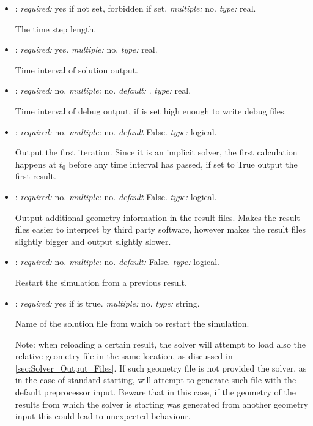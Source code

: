 \begin{itemize}
\item {}: \textit{required:} yes if  not set, forbidden if set. \textit{multiple:} no. \textit{type:} real.

The time step length.

\item {}: \textit{required:} yes. \textit{multiple:} no. \textit{type:} real.

Time interval of solution output.

\item {}: \textit{required:} no. \textit{multiple:} no. \textit{default:} . \textit{type:} real.

Time interval of debug output, if  is set high enough to write debug files.


\item {}: \textit{required:} no. \textit{multiple:} no. \textit{default} False. \textit{type:} logical.

Output the first iteration. Since it is an implicit solver, the first calculation happens at $t_0$ before any time interval has passed, if set to True output the first result.

\item {}: \textit{required:} no. \textit{multiple:} no. \textit{default} False. \textit{type:} logical.

Output additional geometry information in the result files. Makes the result files easier to interpret by third party software, however makes the result files slightly bigger and output slightly slower.

\item {}: \textit{required:} no. \textit{multiple:} no. \textit{default:} False. \textit{type:} logical.

Restart the simulation from a previous result.


\item {}: \textit{required:} yes if  is true. \textit{multiple:} no. \textit{type:} string.

Name of the solution file from which to restart the simulation.

Note: when reloading a certain result, the solver will attempt to load also the relative geometry file in the same location, as discussed in \ref{sec:Solver_Output_Files}. If such geometry file is not provided the solver, as in the case of standard starting, will attempt to generate such file with the default preprocessor input. Beware that in this case, if the geometry of the results from which the solver is starting was generated from another geometry input this could lead to unexpected behaviour.



\end{itemize}
